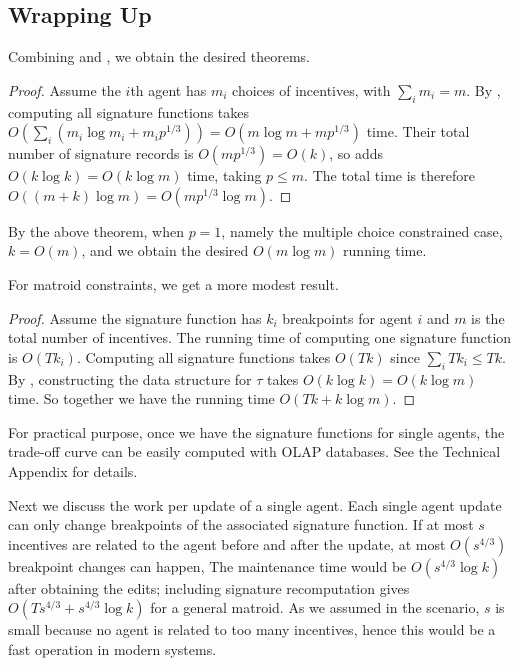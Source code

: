 \documentclass{article}
\newcommand{\lps}{\tau}
\begin{document}
\subsection{Wrapping Up}

Combining  and , we obtain the desired theorems.
\cardinality*
\begin{proof}
Assume the $i$th agent has $m_i$ choices of incentives, with $\sum_i m_i=m$. By , computing all signature functions takes $O(\sum_i(m_i\log m_i+m_i p^{1/3}))=O(m\log m+mp^{1/3})$ time. Their total number of signature records is $O(mp^{1/3})=O(k)$, so  adds $O(k\log k)=O(k\log m)$ time, taking $p\leq m$. The total time is therefore $O((m+k)\log m)=O(mp^{1/3}\log m)$.
\end{proof}
By the above theorem, when $p=1$, namely the multiple choice constrained case, $k=O(m)$, and we obtain the desired $O(m\log m)$ running time.

For matroid constraints, we get a more modest result.
\matroid*
\begin{proof}
    Assume the signature function has $k_i$ breakpoints for agent $i$ and $m$ is the total number of incentives. The running time of computing one signature function is $O(Tk_i)$. 
    Computing all signature functions takes $O(Tk)$ since $\sum_i Tk_i\leq Tk$. 
    By , constructing the data structure for $\lps$ takes $O(k\log k) = O(k\log m)$ time. So together we have the running time $O( Tk+ k\log m) $. 
    \end{proof}

For practical purpose, once we have the signature functions for single agents, the trade-off curve can be easily computed with OLAP databases. See the Technical Appendix for details.

Next we discuss the work per update of a single agent. Each single agent update can only change breakpoints of the associated signature function. If at most $s$ incentives are related to the agent before and after the update, at most $O(s^{4/3})$ breakpoint changes can happen, The maintenance time would be $O(s^{4/3}\log k)$ after obtaining the edits; including signature recomputation gives $O(Ts^{4/3}+s^{4/3}\log k)$ for a general matroid. As we assumed in the scenario, $s$ is small because no agent is related to too many incentives, hence this would be a fast operation in modern systems.
\end{document}
